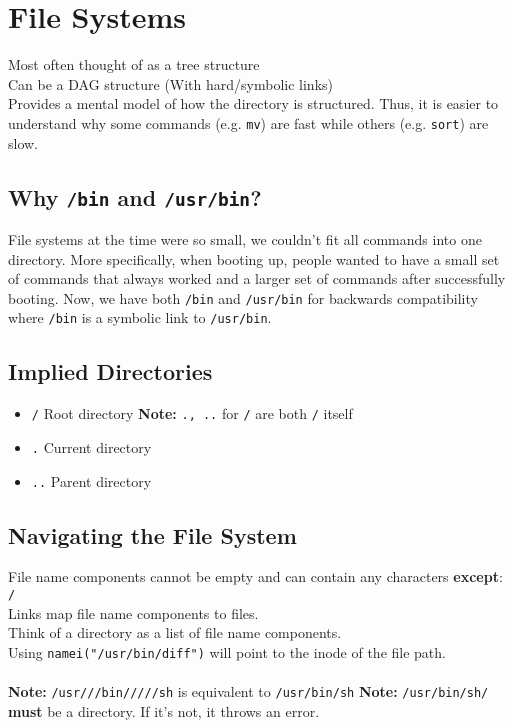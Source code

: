 \documentclass[13pt]{article}
\begin{document}
\tableofcontents
\newpage
\section{File Systems}
Most often thought of as a tree structure \\
Can be a DAG structure (With hard/symbolic links) \\
Provides a mental model of how the directory is structured. Thus, it is easier to understand why some commands (e.g. \texttt{mv}) are fast while others (e.g. \texttt{sort}) are slow.

\subsection{Why \texttt{/bin} and \texttt{/usr/bin}?}
File systems at the time were so small, we couldn't fit all commands into one directory. More specifically, when booting up, people wanted to have a small set of commands that always worked and a larger set of commands after successfully booting. Now, we have both \texttt{/bin} and \texttt{/usr/bin} for backwards compatibility where \texttt{/bin} is a symbolic link to \texttt{/usr/bin}.

\subsection{Implied Directories}
\begin{itemize}[leftmargin = 0pt]
\item [] \texttt{/} Root directory
  \subitem \textbf{Note:} \texttt{., ..} for \texttt{/} are both \texttt{/} itself
\item [] \texttt{.} Current directory
\item [] \texttt{..} Parent directory
\end{itemize}

\subsection{Navigating the File System}
File name components cannot be empty and can contain any characters \textbf{except}: \texttt{/} \\
Links map file name components to files. \\
Think of a directory as a list of file name components. \\
Using \texttt{namei("/usr/bin/diff")} will point to the inode of the file path. \\ \\
\textbf{Note:} \texttt{/usr///bin/////sh} is equivalent to \texttt{/usr/bin/sh}
\textbf{Note:} \texttt{/usr/bin/sh/} \textbf{must} be a directory. If it's not, it throws an error.
\end{document}
